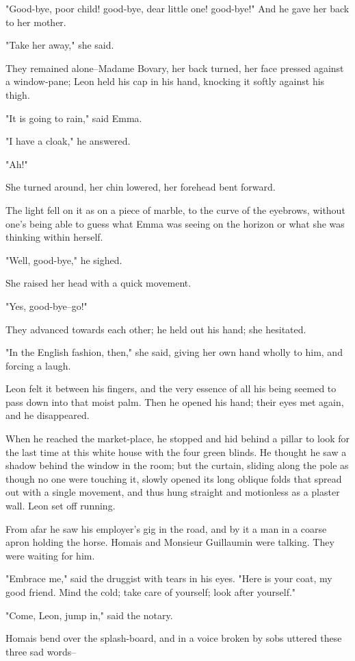 \documentclass[11pt,twocolumn]{ltugboat}
\begin{document}
"Good-bye, poor child! good-bye, dear little one! good-bye!" And he gave
her back to her mother.

"Take her away," she said.

They remained alone--Madame Bovary, her back turned, her face pressed
against a window-pane; Leon held his cap in his hand, knocking it softly
against his thigh.

"It is going to rain," said Emma.

"I have a cloak," he answered.

"Ah!"

She turned around, her chin lowered, her forehead bent forward.

The light fell on it as on a piece of marble, to the curve of the
eyebrows, without one's being able to guess what Emma was seeing on the
horizon or what she was thinking within herself.

"Well, good-bye," he sighed.

She raised her head with a quick movement.

"Yes, good-bye--go!"

They advanced towards each other; he held out his hand; she hesitated.

"In the English fashion, then," she said, giving her own hand wholly to
him, and forcing a laugh.

Leon felt it between his fingers, and the very essence of all his being
seemed to pass down into that moist palm. Then he opened his hand; their
eyes met again, and he disappeared.

When he reached the market-place, he stopped and hid behind a pillar to
look for the last time at this white house with the four green blinds.
He thought he saw a shadow behind the window in the room; but the
curtain, sliding along the pole as though no one were touching it,
slowly opened its long oblique folds that spread out with a single
movement, and thus hung straight and motionless as a plaster wall. Leon
set off running.

From afar he saw his employer's gig in the road, and by it a man in
a coarse apron holding the horse. Homais and Monsieur Guillaumin were
talking. They were waiting for him.

"Embrace me," said the druggist with tears in his eyes. "Here is your
coat, my good friend. Mind the cold; take care of yourself; look after
yourself."

"Come, Leon, jump in," said the notary.

Homais bend over the splash-board, and in a voice broken by sobs uttered
these three sad words--
\end{document}

